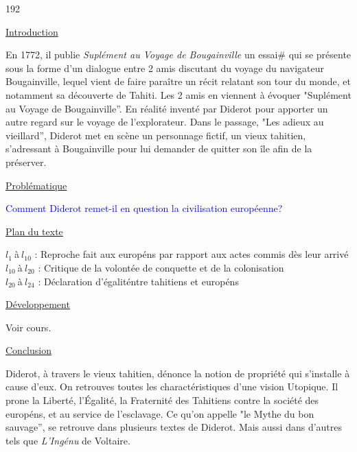 \documentclass[12pt,a4paper]{article}
\begin{document}
\begin{dingautolist}{192}

\item \underline{Introduction} \par
	En 1772, il publie \textit{Supl\'ement au Voyage de Bougainville} un essai\# qui se pr\'esente sous la forme d'un dialogue entre 2 amis discutant du voyage du navigateur Bougainville, 
	lequel vient de faire para\^itre un r\'ecit relatant son tour du monde, et notamment sa d\'ecouverte de Tahiti.
	Les 2 amis en viennent \`a \'evoquer "Supl\'ement au Voyage de Bougainville''. En r\'ealit\'e invent\'e par Diderot pour apporter un autre regard sur le voyage de l'explorateur.
	Dans le passage, "Les adieux au vieillard'', Diderot met en sc\`ene un personnage fictif, un vieux tahitien, s'adressant \`a Bougainville pour lui demander de quitter son \^ile afin de la pr\'eserver.

\item \underline{Probl\'ematique }\par
	\textcolor{blue}{Comment Diderot remet-il en question la civilisation europ\'eenne?}

\item \underline{Plan du texte} \par
	$l_{1}~$\`a$~l_{10}$ : Reproche fait aux europ\'ens par rapport aux actes commis d\`es leur arriv\'e\\
	$l_{10}~$\`a$~l_{20}$ : Critique de la volont\'ee de conquette et de la colonisation\\
	$l_{20}~$\`a$~l_{24}$ : D\'eclaration d'\'egalit\' entre tahitiens et europ\'ens 

\item \underline{D\'eveloppement} \par
        Voir cours.

\item \underline{Conclusion} \par
	Diderot, \`a travers le vieux tahitien, d\'enonce la notion de propri\'et\'e qui s'installe \`a cause d'eux.
	On retrouves toutes les charact\'eristiques d'une vision Utopique.
	Il prone la Libert\'e, l'\'Egalit\'e, la Fraternit\'e des Tahitiens contre la soci\'et\'e des europ\'ens, et au service de l'esclavage.
	Ce qu'on appelle "le Mythe du bon sauvage'', se retrouve dans plusieurs textes de Diderot. Mais aussi dans d'autres tels que \textit{L'Ing\'enu} de Voltaire.

\end{dingautolist}
 \newpage
\end{document}
